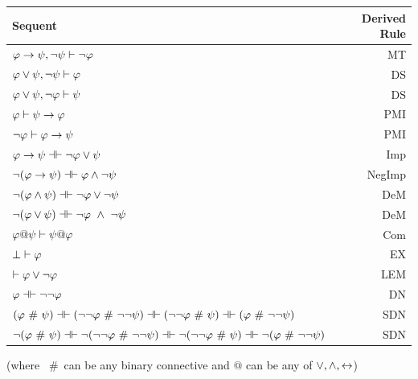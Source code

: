 \begin{center}
\begin{tabular}{l  r}
\textbf{Sequent}                    &       \textbf{Derived Rule} \\ \hline
$\mathcal{\varphi} \rightarrow \mathcal{\psi},  \neg\mathcal{\psi} \vdash \neg \mathcal{\varphi}$   &                       MT  \\
$\mathcal{\varphi} \vee \mathcal{\psi},  \neg\mathcal{\psi} \vdash \mathcal{\varphi}$ & DS\\
$\mathcal{\varphi} \vee \mathcal{\psi},  \neg\mathcal{\varphi}\vdash \mathcal{\psi}$    &      DS  \\
$\mathcal{\varphi} \vdash\mathcal{\psi} \rightarrow \mathcal{\varphi}$  &              PMI  \\
$\neg\mathcal{\varphi}\vdash\mathcal{\varphi}\rightarrow \mathcal{\psi}$  & PMI\\
$\meta{\varphi} \rightarrow\meta{\psi} \pequiv \enot\meta{\varphi}\eor \meta{\psi}$  &                   Imp   \\
$\enot (\meta{\varphi} \rightarrow \meta{\psi}) \pequiv \meta{\varphi} \eand \enot \meta{\psi}$  &               NegImp  \\
$\enot (\meta{\varphi} \eand \meta{\psi})  \pequiv \enot\meta{\varphi}\eor \enot \meta{\psi}$  &                DeM  \\
$\enot (\meta{\varphi} \eor \meta{\psi}) \pequiv \enot\meta{\varphi}\ \eand \ \enot \meta{\psi}$   &               DeM  \\
$\mathcal{\varphi} @ \mathcal{\psi}  \vdash  \mathcal{\psi} @ \mathcal{\varphi}$ &                          Com \\
$\bot \vdash \mathcal{\varphi}$ & EX \\
 $\vdash \mathcal{\varphi}\vee \neg \mathcal{\varphi}$ &                                                    LEM \\
 $\meta{\varphi} \pequiv \enot \enot \meta{\varphi}$     &                              DN  \\
$(\meta{\varphi}  \ \#\  \meta{\psi}) \pequiv (\enot \enot \meta{\varphi}  \ \#\   \enot \enot \meta{\psi}) \pequiv (\enot \enot \meta{\varphi}  \ \#\  \meta{\psi}) \pequiv (\meta{\varphi}  \ \#\  \enot \enot  \meta{\psi})$ & SDN\\
$\enot (\meta{\varphi}  \ \#\  \meta{\psi}) \pequiv \enot (\enot \enot \meta{\varphi}  \ \#\   \enot \enot \meta{\psi}) \pequiv \enot (\enot \enot \meta{\varphi}  \ \#\  \meta{\psi}) \pequiv \enot (\meta{\varphi}  \ \#\  \enot \enot  \meta{\psi})$ & SDN\\
\end{tabular}

\vspace{1em}

(where  \ \#\  can be any binary connective and $@$ can be any of  $\vee, \wedge, \leftrightarrow$)
\end{center}


